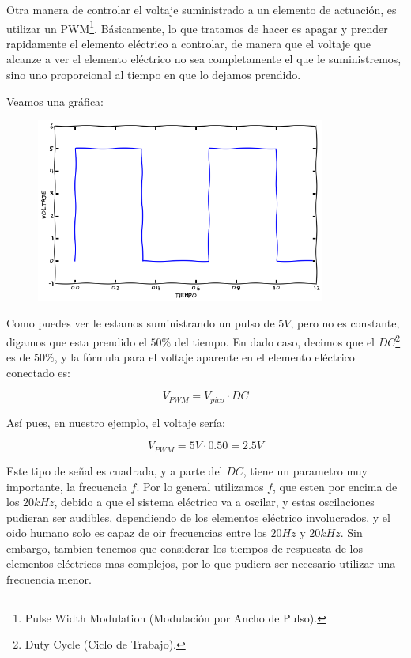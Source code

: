 		Otra manera de controlar el voltaje suministrado a un elemento de actuación, es utilizar un PWM\footnote{Pulse Width Modulation (Modulación por Ancho de Pulso).}. Básicamente, lo que tratamos de hacer es apagar y prender rapidamente el elemento eléctrico a controlar, de manera que el voltaje que alcanze a ver el elemento eléctrico no sea completamente el que le suministremos, sino uno proporcional al tiempo en que lo dejamos prendido.

		Veamos una gráfica:

		\begin{figure}[h]
			\centering \includegraphics[width=0.85\textwidth]{images/PWM.png}
		\end{figure}

		Como puedes ver le estamos suministrando un pulso de $5 V$, pero no es constante, digamos que esta prendido el $50\%$ del tiempo. En dado caso, decimos que el $DC$\footnote{Duty Cycle (Ciclo de Trabajo).} es de $50\%$, y la fórmula para el voltaje aparente en el elemento eléctrico conectado es:

		\begin{equation}
			V_{PWM} = V_{pico} \cdot DC
		\end{equation}

		Así pues, en nuestro ejemplo, el voltaje sería:

		\begin{equation}
			V_{PWM} = 5 V \cdot 0.50 = 2.5 V
		\end{equation}

		Este tipo de señal es cuadrada, y a parte del $DC$, tiene un parametro muy importante, la frecuencia $f$. Por lo general utilizamos $f$, que esten por encima de los $20 kHz$, debido a que el sistema eléctrico va a oscilar, y estas oscilaciones pudieran ser audibles, dependiendo de los elementos eléctrico involucrados, y el oido humano solo es capaz de oir frecuencias entre los $20 Hz$ y $20 kHz$. Sin embargo, tambien tenemos que considerar los tiempos de respuesta de los elementos eléctricos mas complejos, por lo que pudiera ser necesario utilizar una frecuencia menor.

